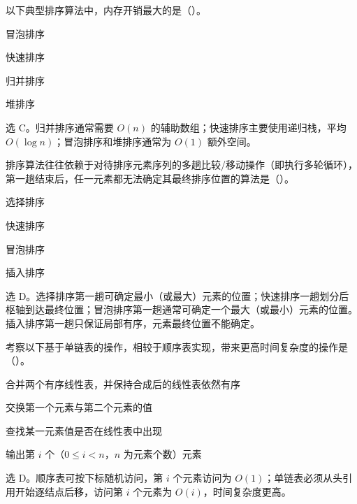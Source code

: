 \begin{question}
以下典型排序算法中，内存开销最大的是（\quad）。
\begin{choiceoptions}[2]
  \item 冒泡排序
  \item 快速排序
  \item 归并排序
  \item 堆排序
\end{choiceoptions}
\begin{solution}
选 C。归并排序通常需要 $O(n)$ 的辅助数组；快速排序主要使用递归栈，平均 $O(\log n)$；冒泡排序和堆排序通常为 $O(1)$ 额外空间。
\end{solution}
\end{question}

\begin{question}
排序算法往往依赖于对待排序元素序列的多趟比较/移动操作（即执行多轮循环），第一趟结束后，任一元素都无法确定其最终排序位置的算法是（\quad）。
\begin{choiceoptions}[2]
  \item 选择排序
  \item 快速排序
  \item 冒泡排序
  \item 插入排序
\end{choiceoptions}
\begin{solution}
选 D。选择排序第一趟可确定最小（或最大）元素的位置；快速排序一趟划分后枢轴到达最终位置；冒泡排序第一趟通常可确定一个最大（或最小）元素的位置。插入排序第一趟只保证局部有序，元素最终位置不能确定。
\end{solution}
\end{question}

\begin{question}
考察以下基于单链表的操作，相较于顺序表实现，带来更高时间复杂度的操作是（\quad）。
\begin{choiceoptions}[1]
  \item 合并两个有序线性表，并保持合成后的线性表依然有序
  \item 交换第一个元素与第二个元素的值
  \item 查找某一元素值是否在线性表中出现
  \item 输出第 $i$ 个（$0\le i<n$，$n$ 为元素个数）元素
\end{choiceoptions}
\begin{solution}
选 D。顺序表可按下标随机访问，第 $i$ 个元素访问为 $O(1)$；单链表必须从头引用开始逐结点后移，访问第 $i$ 个元素为 $O(i)$，时间复杂度更高。
\end{solution}
\end{question}

